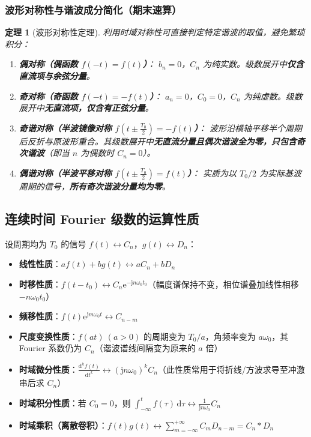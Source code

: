 \documentclass[11pt,a4paper,fontset=fandol]{ctexart}
\newtheorem{theorem}{定理}[section]
\theoremstyle{remark}
\begin{document}
\subsubsection{波形对称性与谐波成分简化（期末速算）}
\begin{theorem}[波形对称性定理]
利用时域对称性可直接判定特定谐波的取值，避免繁琐积分：
\begin{enumerate}
    \item \textbf{偶对称（偶函数 $f(-t) = f(t)$）}：
    $b_n = 0$，$C_n$ 为纯实数。级数展开中\textbf{仅含直流项与余弦分量}。
    \item \textbf{奇对称（奇函数 $f(-t) = -f(t)$）}：
    $a_n = 0$，$C_0 = 0$，$C_n$ 为纯虚数。级数展开中\textbf{无直流项，仅含有正弦分量}。
    \item \textbf{奇谐对称（半波镜像对称 $f\left(t \pm \frac{T_0}{2}\right) = -f(t)$）}：
    波形沿横轴平移半个周期后反折与原波形重合。其级数展开中\textbf{无直流分量且偶次谐波全为零，只包含奇次谐波}（即当 $n$ 为偶数时 $C_n = 0$）。
    \item \textbf{偶谐对称（半波平移对称 $f\left(t \pm \frac{T_0}{2}\right) = f(t)$）}：
    实质为以 $T_0/2$ 为实际基波周期的信号，\textbf{所有奇次谐波分量均为零}。
\end{enumerate}
\end{theorem}

\subsection{连续时间 Fourier 级数的运算性质}

设周期均为 $T_0$ 的信号 $f(t) \longleftrightarrow C_n$，$g(t) \longleftrightarrow D_n$：
\begin{itemize}
    \item \textbf{线性性质}：$a f(t) + b g(t) \longleftrightarrow a C_n + b D_n$
    \item \textbf{时移性质}：$f(t - t_0) \longleftrightarrow C_n \mathrm{e}^{-\mathrm{j}n\omega_0 t_0}$（幅度谱保持不变，相位谱叠加线性相移 $-n\omega_0 t_0$）
    \item \textbf{频移性质}：$f(t)\mathrm{e}^{\mathrm{j}m\omega_0 t} \longleftrightarrow C_{n-m}$
    \item \textbf{尺度变换性质}：$f(at) \ (a>0)$ 的周期变为 $T_0/a$，角频率变为 $a\omega_0$，其 Fourier 系数仍为 $C_n$（谐波谱线间隔变为原来的 $a$ 倍）
    \item \textbf{时域微分性质}：$\frac{\mathrm{d}^k f(t)}{\mathrm{d}t^k} \longleftrightarrow (\mathrm{j}n\omega_0)^k C_n$（此性质常用于将折线/方波求导至冲激串后求 $C_n$）
    \item \textbf{时域积分性质}：若 $C_0 = 0$，则 $\int_{-\infty}^t f(\tau)\,\mathrm{d}\tau \longleftrightarrow \frac{1}{\mathrm{j}n\omega_0} C_n$
    \item \textbf{时域乘积（离散卷积）}：$f(t)g(t) \longleftrightarrow \sum_{m=-\infty}^{+\infty} C_m D_{n-m} = C_n * D_n$
\end{itemize}
\end{document}
